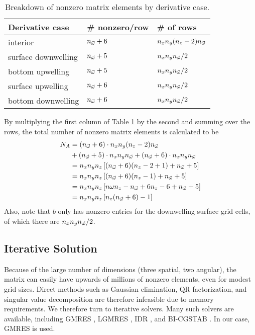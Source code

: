 \begin{table}[H]
  \centering
  \caption{Breakdown of nonzero matrix elements by derivative case.}
  \begin{tabular}{p{}p{}p{}}
    \toprule
    \textbf{Derivative case} & \textbf{\# nonzero/row} & \textbf{\# of rows} \\
    \midrule
    interior & ${n_{\vec{\omega}}}+6$ & $n_xn_y(n_z-2){n_{\vec{\omega}}}$ \\
    surface downwelling & ${n_{\vec{\omega}}}+5$ & $n_xn_y{n_{\vec{\omega}}}/2$ \\
    bottom upwelling & ${n_{\vec{\omega}}}+5$ & $n_xn_y{n_{\vec{\omega}}}/2$ \\
    surface upwelling & ${n_{\vec{\omega}}}+6$ & $n_xn_y{n_{\vec{\omega}}}/2$ \\
    bottom downwelling & ${n_{\vec{\omega}}}+6$ & $n_xn_y{n_{\vec{\omega}}}/2$ \\
    \bottomrule
  \end{tabular}
  \label{tab:nonzero}
\end{table}

By multiplying the first column of Table \ref{tab:nonzero} by the second and summing over the rows, the total number of nonzero matrix elements is calculated to be
\begin{align*}
  N_A &= ({n_{\vec{\omega}}}+6) \cdot n_xn_y(n_z-2){n_{\vec{\omega}}} \\
    &+   ({n_{\vec{\omega}}}+5) \cdot n_xn_y{n_{\vec{\omega}}}
    +   ({n_{\vec{\omega}}}+6) \cdot n_xn_y{n_{\vec{\omega}}} \\
  &= n_x n_y n_z \left[({n_{\vec{\omega}}}+6)(n_z-2+1)+{n_{\vec{\omega}}}+5 \right] \\
  &= n_x n_y n_z \left[({n_{\vec{\omega}}}+6)(n_z-1)+{n_{\vec{\omega}}}+5 \right] \\
  &=  n_x n_y n_z \left[n\omega n_z -{n_{\vec{\omega}}} + 6n_z - 6 + {n_{\vec{\omega}}} + 5 \right] \\
  &=  n_x n_y n_z \left[n_z({n_{\vec{\omega}}}+6)-1\right]
\end{align*}
Also, note that $b$ only has nonzero entries for the downwelling surface grid cells, of which there are $n_x n_y {n_{\vec{\omega}}}/2$.

\subsection{Iterative Solution}
Because of the large number of dimensions (three spatial, two angular), the matrix can easily have upwards of millions of nonzero elements,
even for modest grid sizes.
Direct methods such as Gaussian elimination, QR factorization, and singular value decomposition are therefore infeasible due to memory requirements.
We therefore turn to iterative solvers.
Many such solvers are available, including GMRES \cite{saad_gmres:_1985}, LGMRES \cite{baker_technique_2005}, IDR \cite{sonneveld_idrs:_2008}, and BI-CGSTAB \cite{van_der_vorst_bi-cgstab:_1992}.
In our case, GMRES is used.
